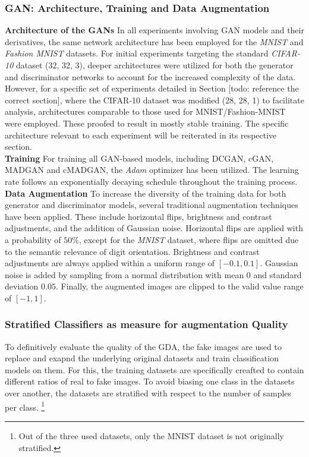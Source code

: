 \subsubsection{GAN: Architecture, Training and Data Augmentation}

\noindent\textbf{Architecture of the GANs}
In all experiments involving GAN models and their derivatives, the same network architecture has been employed for the \textit{MNIST} and \textit{Fashion MNIST} datasets. For initial experiments targeting the standard \textit{CIFAR-10} dataset (32, 32, 3), deeper architectures were utilized for both the generator and discriminator networks to account for the increased complexity of the data. However, for a specific set of experiments detailed in Section [todo: reference the correct section], where the CIFAR-10 dataset was modified (28, 28, 1) to facilitate analysis, architectures comparable to those used for MNIST/Fashion-MNIST were employed. These proofed to result in mostly stable training. The specific architecture relevant to each experiment will be reiterated in its respective section.\\

\noindent\textbf{Training}
For training all GAN-based models, including DCGAN, cGAN, MADGAN and cMADGAN, the \textit{Adam} optimizer has been utilized. The learning rate follows an exponentially decaying schedule throughout the training process.\\

\noindent\textbf{Data Augmentation}\label{body_experiment_dataaugmentation}
To increase the diversity of the training data for both generator and discriminator models, several traditional augmentation techniques have been applied. These include horizontal flips, brightness and contrast adjustments, and the addition of Gaussian noise.
Horizontal flips are applied with a probability of \(50\%\), except for the \textit{MNIST} dataset, where flips are omitted due to the semantic relevance of digit orientation. Brightness and contrast adjustments are always applied within a uniform range of \([-0.1, 0.1]\). Gaussian noise is added by sampling from a normal distribution with mean \(0\) and standard deviation \(0.05\). Finally, the augmented images are clipped to the valid value range of \([-1, 1]\).

\subsubsection{Stratified Classifiers as measure for augmentation Quality}
To definitively evaluate the quality of the GDA, the fake images are used to replace and exapnd the underlying original datasets and train classification models on them. For this, the training datasets are specifically creafted to contain different ratios of real to fake images. To avoid biasing one class in the datasets over another, the datasets are stratified with respect to the number of samples per class. \footnote{Out of the three used datasets, only the MNIST dataset is not originally stratified. }

